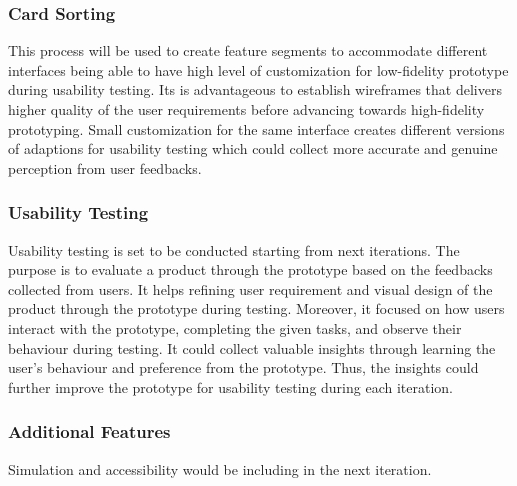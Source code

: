       \subsubsection{Card Sorting}
        \par This process will be used to create feature segments to accommodate different interfaces being able to have high level of customization for low-fidelity prototype during usability testing. Its is advantageous to establish wireframes that delivers higher quality of the user requirements before advancing towards high-fidelity prototyping. Small customization for the same interface creates different versions of adaptions for usability testing which could collect more accurate and genuine perception from user feedbacks.

      \subsubsection{Usability Testing}
        \par Usability testing is set to be conducted starting from next iterations. The purpose is to evaluate a product through the prototype based on the feedbacks collected from users. It helps refining user requirement and visual design of the product through the prototype during testing. Moreover, it focused on how users interact with the prototype, completing the given tasks, and observe their behaviour during testing. It could collect valuable insights through learning the user’s behaviour and preference from the prototype. Thus, the insights could further improve the prototype for usability testing during each iteration.

      \subsubsection{Additional Features}
        \par Simulation and accessibility would be including in the next iteration.